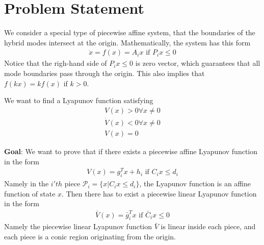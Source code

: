 \documentclass{article}
\begin{document}
\section{Problem Statement}
We consider a special type of piecewise affine system, that the boundaries of the hybrid modes intersect at the origin. Mathematically, the system has this form
\begin{align}
	\dot{x} = f(x) = A_ix \text{ if } P_ix\le 0
\end{align}
Notice that the righ-hand side of $P_ix\le0$ is zero vector, which guarantees that all mode boundaries pass through the origin. This also implies that $f(kx) = kf(x)$ if $k>0$.

We want to find a Lyapunov function satisfying
\begin{align}
	V(x) > 0 \forall x\neq 0\\
	\dot{V}(x) < 0 \forall x\neq 0\\
	V(x) = 0
\end{align}

\textbf{Goal}: We want to prove that if there exists a piecewise affine Lyapunov function in the form 
\begin{align}
	V(x) = g_i^Tx + h_i \text{ if } C_ix\le d_i \label{eq:piecewise_affine_lyapunov}
\end{align}
Namely in the $i'th$ piece $\mathcal{P}_i=\{x | C_ix \le d_i\}$, the Lyapunov function is an affine function of state $x$. Then there has to exist a piecewise linear Lyapunov function in the form
\begin{align}
	\bar{V}(x) = \bar{g}_i^Tx \text{ if } \bar{C}_i x \le 0
\end{align}
Namely the piecewise linear Lyapunov function $\bar{V}$ is linear inside each piece, and each piece is a conic region originating from the origin.
\end{document}
